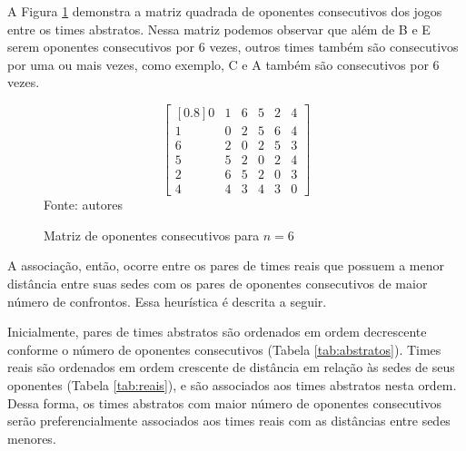 \documentclass[12pt,a4paper]{article}
\begin{document}
A Figura \ref{matriz:consecutivos} demonstra a matriz quadrada de oponentes consecutivos dos jogos entre os times abstratos. Nessa matriz podemos observar que além de B e E serem oponentes consecutivos por 6 vezes, outros times também são consecutivos por uma ou mais vezes, como exemplo, C e A também são consecutivos por 6 vezes.

\begin{figure}[H]
	\centering
	\caption{Matriz de oponentes consecutivos para $n=6$}
	\label{matriz:consecutivos}
	\vspace{-0.7cm}
	\[ \begin{bmatrix}[0.8]
	0 & 1 & 6 & 5 & 2 & 4 \\
	1 & 0 & 2 & 5 & 6 & 4 \\
	6 & 2 & 0 & 2 & 5 & 3 \\
	5 & 5 & 2 & 0 & 2 & 4 \\
	2 & 6 & 5 & 2 & 0 & 3 \\
	4 & 4 & 3 & 4 & 3 & 0
	\end{bmatrix} \]
	\footnotesize Fonte: autores
\end{figure}

A associação, então, ocorre entre os pares de times reais que possuem a menor distância entre suas sedes com os pares de oponentes consecutivos de maior número de confrontos. Essa heurística é descrita a seguir.

Inicialmente, pares de times abstratos são ordenados em ordem decrescente conforme o número de oponentes consecutivos (Tabela \ref{tab:abstratos}). Times reais são ordenados em ordem crescente de distância em relação às sedes de seus oponentes (Tabela \ref{tab:reais}), e são associados aos times abstratos nesta ordem. Dessa forma, os times abstratos com maior número de oponentes consecutivos serão preferencialmente associados aos times reais com as distâncias entre sedes menores.
\end{document}
